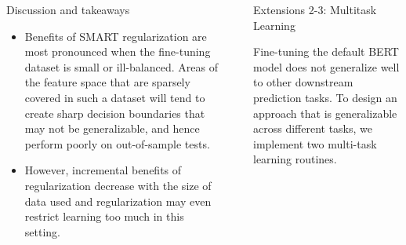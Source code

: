\documentclass[final]{beamer}
\newlength{\sepwidth}
\newlength{\colwidth}
\newcommand{\separatorcolumn}{\begin{column}{\sepwidth}\end{column}}
\begin{document}
\begin{frame}[t]
\begin{columns}[t]
\begin{column}{\colwidth}
\begin{alertblock}{\small Discussion and takeaways}
\begin{itemize}

 \item Benefits of SMART regularization are most pronounced when the fine-tuning dataset is small or ill-balanced. Areas of the feature space that are sparsely covered in such a dataset will tend to create sharp decision boundaries that may not be generalizable, and hence perform poorly on out-of-sample tests.
 \item However, incremental benefits of regularization decrease with the size of data used and regularization may even restrict learning too much in this setting.

\end{itemize}

\end{alertblock}

\end{column}

\separatorcolumn

\begin{column}{\colwidth}

  \begin{block}{Extensions 2-3: Multitask Learning}

    Fine-tuning the default BERT model does not generalize well to other downstream prediction tasks. To design an approach that is generalizable across different tasks, we implement two multi-task learning routines. 
    

\end{block}
\end{column}
\end{columns}
\end{frame}
\end{document}
